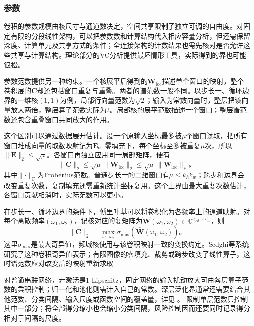 \subsubsection{参数}
\label{sec:cnn-parameter-generalization}

卷积的参数规模由核尺寸与通道数决定，空间共享限制了独立可调的自由度。对固定有限的分段线性架构，可以把参数数和计算结构代入相应容量分析，但还需保留深度、计算单元及共享方式的条件；全连接架构的计数结果也需先核对是否允许这些共享与计算结构。理论部分的VC分析提供最坏情形工具，实际得到的界也可能很松。

参数范数提供另一种约束。一个核展平后得到的$\bm W_{\mathrm{loc}}$描述单个窗口的映射，整个卷积层的$\bm C$却还包括窗口重复与重叠。两者的谱范数一般不同。以步长一、循环边界的一维核$(1,1)$为例，局部行向量范数为$\sqrt2$；输入为常数向量时，整层把该向量放大两倍，整层算子范数实际为$2$。局部核的展平范数描述一个窗口；整层谱范数还包含重叠窗口共同放大的作用。

这个区别可以通过数据展开估计。设一个原输入坐标最多被$\mu$个窗口读取，把所有窗口堆成向量的取数映射记为$\bm E$。零填充下，每个坐标至多被重复$\mu$次，所以$\lVert\bm E\rVert_2\leq\sqrt\mu$。各窗口再独立应用同一局部矩阵，便有
\begin{equation}
  \lVert\bm C\rVert_2
    \leq\sqrt\mu\,\lVert\bm W_{\mathrm{loc}}\rVert_2
    \leq\sqrt\mu\,\lVert\bm W_{\mathrm{loc}}\rVert_{\mathrm F}\text{。}
  \label{eq:cnn-operator-bound}
\end{equation}
其中$\lVert\cdot\rVert_{\mathrm F}$为Frobenius范数。普通步长一的二维窗口有$\mu\leq k_hk_w$；跨步和边界会改变重复次数，复制填充还需重新统计坐标复用。这个上界由最大重复次数估计，各窗口贡献相消时，实际范数可以更小。

在步长一、循环边界的条件下，傅里叶基可以将卷积化为各频率上的通道映射。对每个离散频率$(\omega_1,\omega_2)$，记核对应的复矩阵为$\widehat{\bm W}(\omega_1,\omega_2)\in\mathbb C^{c_{\mathrm{out}}\times c_{\mathrm{in}}}$，则
\begin{equation}
  \lVert\bm C\rVert_2
    =\max_{\omega_1,\omega_2}
       \sigma_{\max}\!\left(\widehat{\bm W}(\omega_1,\omega_2)\right)\text{。}
  \label{eq:cnn-fourier-norm}
\end{equation}
这里$\sigma_{\max}$是最大奇异值，频域核使用与该卷积映射一致的变换约定。Sedghi等系统研究了这种卷积奇异值表示；有限图像的零填充、裁剪或跨步改变了线性算子，这时谱范数应对改变后的映射重新求取

对普通串联网络，若激活是$1$-Lipschitz，固定网络的输入扰动放大可由各层算子范数的乘积控制；归一化和池化则需计入自己的常数。深层泛化界通常还需要结合其他范数、分类间隔、输入尺度或函数空间的覆盖量，详见
。
限制单层范数只控制其中一部分；将全部得分缩小也会缩小分类间隔，风险控制因而还要同时记录得分相对于间隔的尺度。

